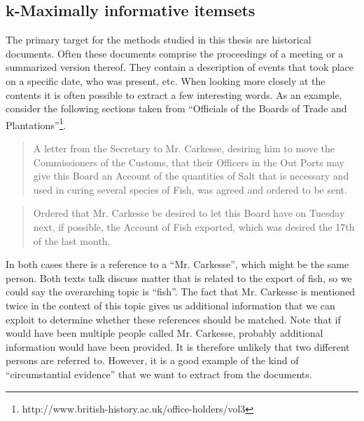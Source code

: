 \subsection{k-Maximally informative itemsets}
\label{sec:miki}

The primary target for the methods studied in this thesis are historical documents.
Often these documents comprise the proceedings of a meeting or a summarized version thereof.
They contain a description of events that took place on a specific date, who was present, etc.
When looking more closely at the contents it is often possible to extract a few interesting words.
As an example, consider the following sections taken from ``Officials of the Boards of Trade and Plantations''\footnote{http://www.british-history.ac.uk/office-holders/vol3}.

\begin{quote}
    A letter from the Secretary to Mr. Carkesse, desiring him to move the Commissioners of the Customs, that their Officers in the Out Ports may give this Board an Account of the quantities of Salt that is necessary and used in curing several species of Fish, was agreed and ordered to be sent.
\end{quote}

\begin{quote}
    Ordered that Mr. Carkesse be desired to let this Board have on Tuesday next, if possible, the Account of Fish exported, which was desired the 17th of the last month.
\end{quote}

\noindent In both cases there is a reference to a ``Mr. Carkesse'', which might be the same person.
Both texts talk discuss matter that is related to the export of fish, so we could say the overarching topic is ``fish''.
The fact that Mr. Carkesse is mentioned twice in the context of this topic gives us additional information that we can exploit to determine whether these references should be matched.
Note that if would have been multiple people called Mr. Carkesse, probably additional information would have been provided.
It is therefore unlikely that two different persons are referred to.
However, it is a good example of the kind of ``circumstantial evidence'' that we want to extract from the documents.

